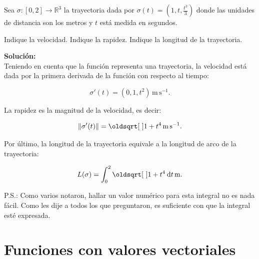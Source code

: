 \documentclass{fmbvecto}
\begin{document}
\begin{problema}[Cinemática]

    Sea \(\sigma\colon [0,2] \to \mathbb{R}^{3}\) la trayectoria dada por \(\sigma (t) = \left(1,t,\frac{t^3}{3}\right)\) donde las unidades de distancia son los metros y \(t\) está medida en segundos.
    \begin{enumerate}[label=14.\arabic*]
        \itemp[\(0.\bar{1}\)] Indique la velocidad.
        \itemp[\(0.\bar{1}\)] Indique la rapidez.
         \itemp[\(0.\bar{1}\)] Indique la longitud de la trayectoria.
    \end{enumerate}

    
\vspace{1em}
\tcblower
\textbf{Solución:}\\

    Teniendo en cuenta que la función representa una trayectoria, la velocidad está dada por la primera derivada de la función con respecto al tiempo:
    \begin{gbox}
        \begin{equation*}
            \sigma' (t) = (0,1,t^2) \, \text{m} \, \text{s}^{-1}.
        \end{equation*}
    \end{gbox}
    

    La rapidez es la magnitud de la velocidad, es decir: 
    \begin{gbox}
        \begin{equation*}
            \norm{\sigma' (t)} = \sqrt{1+t^4} \, \text{m} \, \text{s}^{-1}.
        \end{equation*}
    \end{gbox}
    
   Por último, la longitud de la trayectoria equivale a la longitud de arco de la trayectoria:	
    \begin{gbox}
        \begin{equation*}
            L (\sigma) = \defint{\sqrt{1+t^4}}[t]{0}{2} \, \text{m}.
        \end{equation*}
    \end{gbox}
    P.S.: Como varios notaron, hallar un valor numérico para esta integral no es nada fácil. Como les dije a todos los que preguntaron, es suficiente con que la integral esté expresada.
\end{problema}


\section{Funciones con valores vectoriales}
\end{document}
